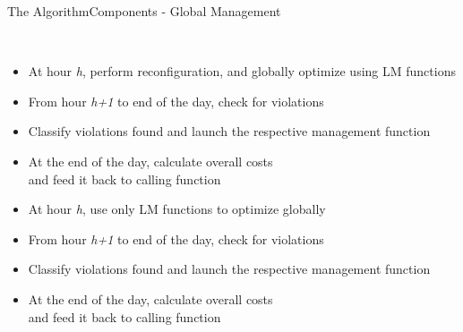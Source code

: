 \documentclass[xcolor=svgnames,aspectratio=32,8pt]{beamer}
\begin{document}

\begin{frame}
  {The Algorithm}{Components - Global Management}
  \begin{changemargin}{-1cm}{-0.8cm}
  \centering
    \\
  \vspace{0.5cm}
  \begin{minipage}[!h]{0.5\paperwidth}
  \centering
    \begin{itemize}
      \item At hour \emph{h}, perform reconfiguration, and globally optimize using LM functions
      \item From hour \emph{h+1} to end of the day, check for violations
      \item Classify violations found and launch the respective management function
      \item At the end of the day, calculate overall costs\\and feed it back to calling function
    \end{itemize}
  \end{minipage}%
  \begin{minipage}[!h]{0.5\paperwidth}
  \centering
    \begin{itemize}
      \item At hour \emph{h}, use only LM functions to optimize globally
      \item From hour \emph{h+1} to end of the day, check for violations
      \item Classify violations found and launch the respective management function
      \item At the end of the day, calculate overall costs\\and feed it back to calling function
    \end{itemize}
  \end{minipage}
  \end{changemargin}
\end{frame}

\end{document}
